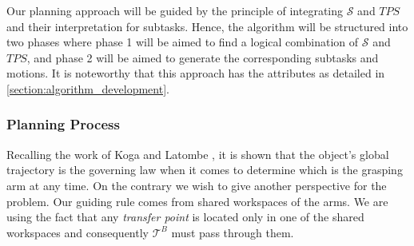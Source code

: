 \documentclass[english]{article}
\theoremstyle{definition}
\begin{document}
Our planning approach will be guided by the principle of integrating $\mathcal{S}$ and $TPS$ and their interpretation for subtasks. Hence, the algorithm will be structured into two phases where phase 1 will be aimed to find a logical combination of $\mathcal{S}$ and $TPS$, and phase 2 will be aimed to generate the corresponding subtasks and motions. It is noteworthy that this approach has the attributes as detailed in \ref{section:algorithm_development}.

\subsubsection*{Planning Process}
Recalling the work of Koga and Latombe \cite{koga1994multi}, it is shown that the object's global trajectory is the governing law when it comes to determine which is the grasping arm at any time. On the contrary we wish to give another perspective for the problem. Our guiding rule comes from shared workspaces of the arms. We are using the fact that any \textit{transfer point} is located only in one of the shared workspaces and consequently $\mathcal{T}^B$ must pass through them. 
\end{document}
